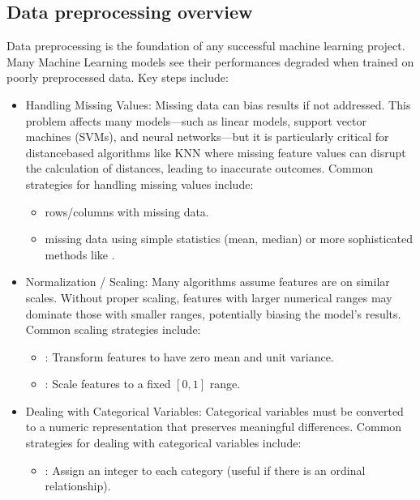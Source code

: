 \documentclass[letterpaper,10pt,english]{jupyterBook}
\begin{document}
\subsection{Data preprocessing overview}
\label{\detokenize{03:data-preprocessing-overview}}
\sphinxAtStartPar
Data preprocessing is the foundation of any successful machine learning project. Many Machine Learning models see their performances degraded when trained on poorly preprocessed data. Key steps include:
\begin{itemize}
\item {} 
\sphinxAtStartPar
Handling Missing Values: Missing data can bias results if not addressed. This problem affects many models—such as linear models, support vector machines (SVMs), and neural networks—but it is particularly critical for distance\sphinxhyphen{}based algorithms like KNN where missing feature values can disrupt the calculation of distances, leading to inaccurate outcomes. Common strategies for handling missing values include:
\begin{itemize}
\item {} 
\sphinxAtStartPar
{} rows/columns with missing data.

\item {} 
\sphinxAtStartPar
{} missing data using simple statistics (mean, median) or more sophisticated methods like .

\end{itemize}

\item {} 
\sphinxAtStartPar
Normalization / Scaling: Many algorithms assume features are on similar scales. Without proper scaling, features with larger numerical ranges may dominate those with smaller ranges, potentially biasing the model’s results. Common scaling strategies include:
\begin{itemize}
\item {} 
\sphinxAtStartPar
{}: Transform features to have zero mean and unit variance.

\item {} 
\sphinxAtStartPar
{}: Scale features to a fixed \([0,1]\) range.

\end{itemize}

\item {} 
\sphinxAtStartPar
Dealing with Categorical Variables: Categorical variables must be converted to a numeric representation that preserves meaningful differences. Common strategies for dealing with categorical variables include:
\begin{itemize}
\item {} 
\sphinxAtStartPar
{}: Assign an integer to each category (useful if there is an ordinal relationship).


\end{itemize}
\end{itemize}
\end{document}
